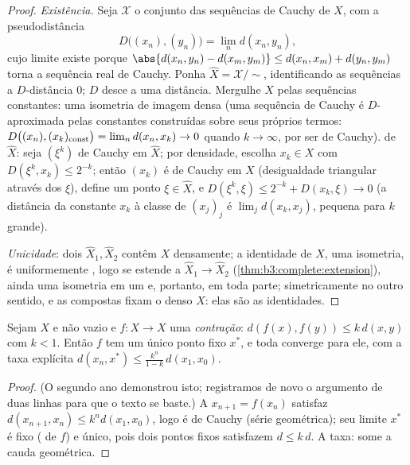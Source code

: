 \begin{proof}
\emph{Existência.} Seja $\mathcal X$ o conjunto das sequências de Cauchy de
$X$, com a pseudodistância
\[
D\bigl((x_n), (y_n)\bigr) = \lim_n d(x_n, y_n),
\]
cujo limite existe porque $\abs{d(x_n, y_n) - d(x_m, y_m)}
\leq d(x_n, x_m) + d(y_n, y_m)$ torna a sequência real de Cauchy. Ponha
$\hat X = \mathcal X/{\sim}$, identificando as sequências a $D$-distância $0$; $D$
desce a uma distância. Mergulhe $X$ pelas sequências constantes: uma
isometria de imagem densa (uma sequência de Cauchy é
$D$-aproximada pelas constantes construídas sobre seus próprios
termos: $D\bigl((x_n), (x_k)_{\rm
const}\bigr) = \lim_n d(x_n, x_k) \to 0$ quando $k \to \infty$, por ser de Cauchy).  de $\hat X$:
seja $(\xi^k)$ de Cauchy em $\hat X$; por densidade, escolha $x_k \in X$ com
$D(\xi^k, x_k)
\leq 2^{-k}$; então $(x_k)$ é de Cauchy em $X$ (desigualdade triangular
através dos $\xi$), define um ponto $\xi \in \hat
X$, e $D(\xi^k, \xi) \leq 2^{-k} + D(x_k, \xi) \to 0$ (a distância da
constante $x_k$ à classe de $(x_j)_j$ é $\lim_j d(x_k, x_j)$, pequena para $k$ grande).

\emph{Unicidade}: dois  $\hat X_1, \hat X_2$ contêm $X$ densamente; a
identidade de $X$, uma isometria, é uniformemente , logo se
estende a $\hat X_1 \to \hat X_2$ (\cref{thm:b3:complete:extension}), ainda uma isometria em um  e, portanto, em toda parte; simetricamente no outro sentido, e as
compostas fixam o denso $X$: elas são as identidades.
\end{proof}

\begin{theorem}\label{thm:b3:complete:banach}
Sejam $X$  e não vazio e $f \colon X \to X$ uma \emph{contração}: $d(f(x), f(y)) \leq k\,d(x,y)$ com
$k < 1$. Então $f$ tem um único ponto fixo $x^*$, e toda 
converge para ele, com a taxa explícita $d(x_n, x^*) \leq
\frac{k^n}{1-k}\,d(x_1, x_0)$.
\end{theorem}

\begin{proof}
(O segundo ano demonstrou isto; registramos de novo o argumento de duas
linhas para que o texto se baste.) A  $x_{n+1} = f(x_n)$ satisfaz $d(x_{n+1},
x_n) \leq k^nd(x_1, x_0)$, logo é
de Cauchy (série geométrica); seu limite $x^*$ é fixo (
de $f$) e único, pois dois pontos fixos satisfazem $d \leq k\,d$. A taxa: some
a cauda geométrica.
\end{proof}

